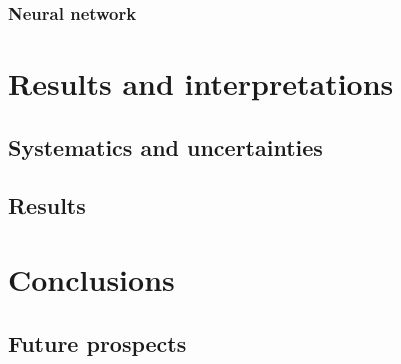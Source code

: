 \documentclass[a4paper, 10pt, openright]{report}
\begin{document}
\subsection{Neural network} \label{section:NN}


\chapter{Results and interpretations} \label{chapter:FinalResults}
\section{Systematics and uncertainties} \label{section:Systematics}
\section{Results}

\chapter{Conclusions} \label{chapter:Conclusion}
\section{Future prospects}
\end{document}
